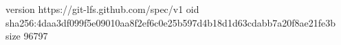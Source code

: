 version https://git-lfs.github.com/spec/v1
oid sha256:4daa3df099f5e09010aa8f2ef6c0e25b597d4b18d1d63cdabb7a20f8ae21fe3b
size 96797
